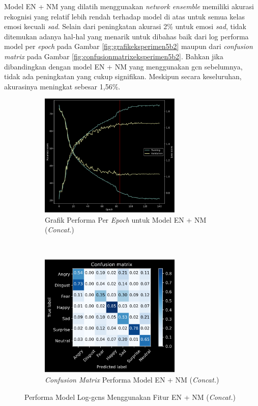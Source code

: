 Model EN + NM yang dilatih menggunakan \textit{network ensemble} memiliki akurasi rekognisi yang relatif lebih rendah terhadap model di atas untuk semua kelas emosi kecuali \textit{sad}. Selain dari peningkatan akurasi 2\% untuk emosi \textit{sad}, tidak ditemukan adanya hal-hal yang menarik untuk dibahas baik dari log performa model per \textit{epoch} pada Gambar \ref{fig:grafikeksperimen5b2} maupun dari \textit{confusion matrix} pada Gambar \ref{fig:confusionmatrixeksperimen5b2}. Bahkan jika dibandingkan dengan model EN + NM yang menggunakan \acrshort{gcn} sebelumnya, tidak ada peningkatan yang cukup signifikan. Meskipun secara keseluruhan, akurasinya meningkat sebesar 1,56\%.

\begin{figure}[!t]
    \centering
    \begin{subfigure}[t]{6.75cm}
        \includegraphics[width=6.75cm]{gambar/eksperimen5b3_grafik1.png}
        \caption{Grafik Performa Per \textit{Epoch} untuk Model EN + NM (\textit{Concat.})}
        \label{fig:grafikeksperimen5b3}
    \end{subfigure}
    ~~~
    \begin{subfigure}[t]{6.75cm}
        \includegraphics[width=6.75cm]{gambar/eksperimen5b3_matriks1.png}
        \caption{\textit{Confusion Matrix} Performa Model EN + NM (\textit{Concat.})}
        \label{fig:confusionmatrixeksperimen5b3}
    \end{subfigure}
    \caption{Performa Model Log-\acrshort{gcns} Menggunakan Fitur EN + NM (\textit{Concat.})}
    \label{fig:hasileksperimen5b3}
\end{figure}
